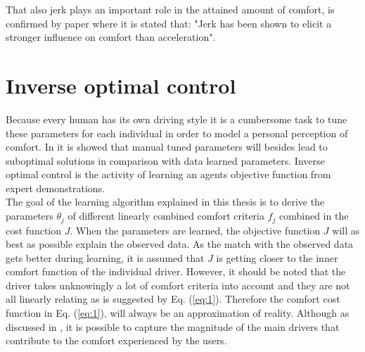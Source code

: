 That also jerk plays an important role in the attained amount of comfort, is confirmed by paper \cite{Gianna1996} where it is stated that: "Jerk has been shown to elicit a stronger influence on comfort than acceleration".




\section{Inverse optimal control}
\label{s:inverse re le}
Because every human has its own driving style it is a cumbersome task to tune these parameters for each individual in order to model a personal perception of comfort. In \cite{Powers} it is showed that manual tuned parameters will besides lead  to suboptimal solutions in comparison with data learned parameters. 
Inverse optimal control is the activity of learning an agents objective function from expert demonstrations. \cite{Arenz2017} \\

The goal of the learning algorithm explained in this thesis is to derive the parameters $\theta_j$ of different linearly combined comfort criteria $f_j$ combined in the cost function $J$. When the parameters are learned, the objective function $J$ will as best as possible explain the observed data. As the match with the observed data gets better during learning, it is assumed that $J$ is getting closer to the inner comfort function of the individual driver. However, it should be noted that the driver takes unknowingly a lot of comfort criteria into account and they are not all linearly relating as is suggested by Eq. (\ref{eq:1}). Therefore the comfort cost function in Eq. (\ref{eq:1}), will always be an approximation of reality. Although as discussed in \cite{Kuderer2015a}, it is possible to capture the magnitude of the main drivers that contribute to the comfort experienced by the users.\\

